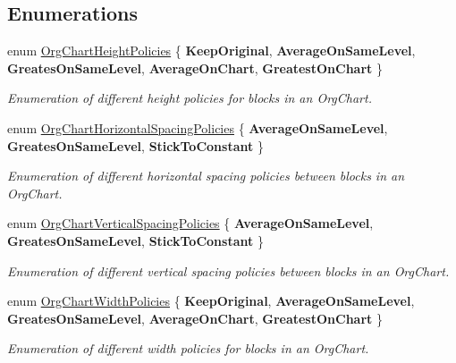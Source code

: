 \subsection*{\-Enumerations}
\begin{DoxyCompactItemize}
\item 
enum \hyperlink{namespace_brown_recognition_common_ad4408ca473997d3ec1b071e5f5c4573f}{\-Org\-Chart\-Height\-Policies} \{ \*
{\bfseries \-Keep\-Original}, 
{\bfseries \-Average\-On\-Same\-Level}, 
{\bfseries \-Greates\-On\-Same\-Level}, 
{\bfseries \-Average\-On\-Chart}, 
\*
{\bfseries \-Greatest\-On\-Chart}
 \}
\begin{DoxyCompactList}\small\item\em \-Enumeration of different height policies for blocks in an \-Org\-Chart. \end{DoxyCompactList}\item 
enum \hyperlink{namespace_brown_recognition_common_ac84ab02b07772204f06e83ed86500823}{\-Org\-Chart\-Horizontal\-Spacing\-Policies} \{ {\bfseries \-Average\-On\-Same\-Level}, 
{\bfseries \-Greates\-On\-Same\-Level}, 
{\bfseries \-Stick\-To\-Constant}
 \}
\begin{DoxyCompactList}\small\item\em \-Enumeration of different horizontal spacing policies between blocks in an \-Org\-Chart. \end{DoxyCompactList}\item 
enum \hyperlink{namespace_brown_recognition_common_a1396f230cbda4b33de9ba5d56c9790c7}{\-Org\-Chart\-Vertical\-Spacing\-Policies} \{ {\bfseries \-Average\-On\-Same\-Level}, 
{\bfseries \-Greates\-On\-Same\-Level}, 
{\bfseries \-Stick\-To\-Constant}
 \}
\begin{DoxyCompactList}\small\item\em \-Enumeration of different vertical spacing policies between blocks in an \-Org\-Chart. \end{DoxyCompactList}\item 
enum \hyperlink{namespace_brown_recognition_common_a8e1f3265a68d8df8c7cc278d6c116a7d}{\-Org\-Chart\-Width\-Policies} \{ \*
{\bfseries \-Keep\-Original}, 
{\bfseries \-Average\-On\-Same\-Level}, 
{\bfseries \-Greates\-On\-Same\-Level}, 
{\bfseries \-Average\-On\-Chart}, 
\*
{\bfseries \-Greatest\-On\-Chart}
 \}
\begin{DoxyCompactList}\small\item\em \-Enumeration of different width policies for blocks in an \-Org\-Chart. \end{DoxyCompactList}\item 

\end{DoxyCompactItemize}
